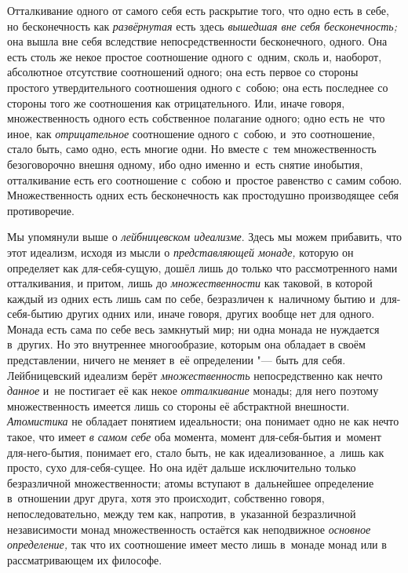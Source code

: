 Отталкивание одного от самого себя есть раскрытие того, что одно есть в
себе, но бесконечность как {\em развёрнутая} есть здесь
{\em вышедшая вне себя бесконечность;} она вышла вне
себя вследствие непосредственности бесконечного, одного. Она есть столь же
некое простое соотношение одного с~одним, сколь и, наоборот, абсолютное
отсутствие соотношений одного; она есть первое со стороны простого
утвердительного соотношения одного с~собою; она есть последнее со стороны
того же соотношения как отрицательного. Или, иначе говоря, множественность
одного есть собственное полагание одного; одно есть не~что иное, как
{\em отрицательное} соотношение одного с~собою, и~это
соотношение, стало быть, само одно, есть многие одни. Но вместе с~тем
множественность безоговорочно внешня одному, ибо одно именно и~есть снятие
инобытия, отталкивание есть его соотношение с~собою и~простое равенство с
самим собою. Множественность одних есть бесконечность как простодушно
производящее себя противоречие.


Мы упомянули выше о {\em лейбницевском идеализме}. Здесь
мы можем прибавить, что этот идеализм, исходя из мысли о
{\em представляющей монаде,} которую он определяет как
для-себя-сущую, дошёл лишь до только что рассмотренного нами отталкивания,
и притом, лишь до {\em множественности} как таковой, в
которой каждый из одних есть лишь сам по себе, безразличен к~наличному
бытию и~для-себя-бытию других одних или, иначе говоря, других вообще нет
для одного. Монада есть сама по себе весь замкнутый мир; ни одна монада не
нуждается в~других. Но это внутреннее многообразие, которым она обладает в
своём представлении, ничего не меняет в~её определении "--- быть для себя.
Лейбницевский идеализм берёт {\em множественность}
непосредственно как нечто {\em данное} и~не постигает
её как некое {\em отталкивание} монады; для него
поэтому множественность имеется лишь со стороны её абстрактной внешности.
{\em Атомистика} не обладает понятием идеальности; она
понимает одно не как нечто такое, что имеет {\em в
самом себе} оба момента, момент для-себя-бытия и~момент для-него-бытия,
понимает его, стало быть, не как идеализованное, а~лишь как просто, сухо
для-себя-сущее. Но она идёт дальше исключительно только безразличной
множественности; атомы вступают в~дальнейшее определение в~отношении друг
друга, хотя это происходит, собственно говоря, непоследовательно, между тем
как, напротив, в~указанной безразличной независимости монад множественность
остаётся как неподвижное {\em основное определение,}
так что их соотношение имеет место лишь в~монаде монад или в
рассматривающем их философе.

